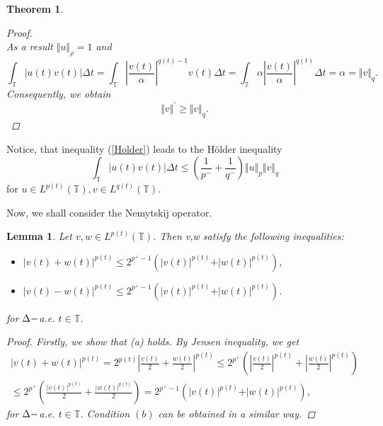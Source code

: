 \documentclass[12pt,a4paper,oneside,titlepage]{article}
\newtheorem{Twierdzenie}{Theorem}
\newtheorem{Lemat}{Lemma}
\begin{document}
\begin{Twierdzenie}
\begin{proof}
\begin{equation}
\end{equation}
As a result $\Vert u \Vert_{\rho}=1$ and
\begin{equation}
\nonumber
\int_{\mathbb{T}} \vert u(t) v(t) \vert \Delta t = \int_{\mathbb{T}} \left\vert \frac{v(t)}{\alpha} \right\vert^{q(t)-1} v(t) \Delta t  = \int_{\mathbb{T}} \alpha \left\vert \frac{v(t)}{\alpha} \right\vert^{q(t)} \Delta t = \alpha = \Vert v \Vert_{q}.
\end{equation}
Consequently, we obtain
\begin{equation}
\nonumber
\Vert v \Vert^{'} \geq  \Vert v \Vert_{q} .
\end{equation}
\end{proof}
\end{Twierdzenie}

Notice, that inequality (\ref{Holder}) leads to the Hölder inequality 
\begin{equation}
\label{Holder_org}
\int_{\mathbb{T}} \vert u(t) v(t) \vert \Delta t \leq  \left(  \frac{1}{p^-} + \frac{1}{q^-}  \right) \Vert u \Vert_{p} \Vert v \Vert_{q}
\end{equation}
for $u \in L^{p(t)}(\mathbb{T}), v \in L^{q(t)}(\mathbb{T}) $.
\bigskip

Now, we shall consider the Nemytskij operator.

\begin{Lemat} Let $v,w \in L^{p(t)}(\mathbb{T})$. Then v,w satisfy the following inequalities:
\begin{itemize}
\item[(a)] 
\label{uw_1}
$ \vert v(t) + w(t) \vert^{p(t)} \leq 2^{p^{+}-1} \left( \vert v(t) \vert^{p(t)} + \vert w(t) \vert^{p(t)} \right)$,
\item[(b)] $\vert v(t) - w(t) \vert^{p(t)} \leq 2^{p^{+}-1} \left( \vert v(t) \vert^{p(t)} + \vert w(t) \vert^{p(t)} \right)$.
\end{itemize}
for $\Delta \-- $a.e. $t \in \mathbb{T}$.
\begin{proof}
Firstly, we show that (a) holds. By Jensen inequality, we get
\begin{equation}
\nonumber
\begin{split}
\vert v(t) + w(t) \vert^{p(t)} = 2^{p(t)} \left\vert \frac{v(t)}{2} + \frac{w(t)}{2} \right\vert^{p(t)}  \leq 2^{p^+} \left( \left\vert \frac{v(t)}{2} \right\vert^{p(t)} + \left\vert \frac{w(t)}{2} \right\vert^{p(t)} \right) \\ \leq 2^{p^+} \left(   \frac{\vert v(t) \vert^{p(t)}}{2}  +  \frac{\vert w(t) \vert^{p(t)}}{2}  \right)  = 2^{p^{+}-1}  \left( \vert v(t) \vert^{p(t)} + \vert w(t) \vert^{p(t)} \right),
\end{split}
\end{equation}
for $\Delta \-- $a.e. $t \in \mathbb{T}$. Condition $(b)$ can be obtained in a similar way.
\end{proof}
\end{Lemat}
\end{document}
